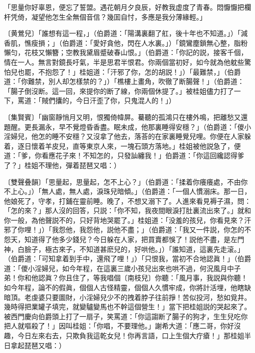 \begin{myquote}
「思量你好辜恩，便忘了誓盟。遇花朝月夕良辰，好教我虚度了青春。悶懨懨把欄杆凭倚，凝望他怎生全無個音信？幾囬自忖，多應是我分薄緣輕。」

{\markfont〔黄鶯兒〕}「誰想有這一程，」{\markfont\small\color{mydarkgray}（伯爵道：「陽溝裏翻了舡，後十年也不知道。」）}「減香肌，憔瘦損；」{\markfont\small\color{mydarkgray}（伯爵道：「愛好貪他，閃在人水裏。」）}「鏡鸞塵鎖無心整，脂粉懶匀，花枝又懶簪；空教我黛眉蹙破春山恨。」{\markfont\small\color{mydarkgray}（伯爵道：「你記的説，接客千個，情在一人。無言對鏡長吁氣，半是思君半恨君。你兩個當初好，如今就為他躭些驚怕兒也罷，不抱怨了！」桂姐道：「汗邪了你，怎的胡説！」）}「最難禁，」{\markfont\small\color{mydarkgray}（伯爵道：「你難禁，別人却怎樣禁的？」）}「樵樓上畫角，吹徹了断腸聲！」{\markfont\small\color{mydarkgray}（伯爵道：「腸子倒沒断。這一回，來提你的断了線，你兩個休提了。」被桂姐儘力打了一下，罵道：「賊們攮的，今日汗歪了你，只鬼混人的！」）}

{\markfont〔集賢賓〕}「幽窗靜悄月又明，恨獨倚幃屏。驀聽的孤鴻只在樓外鳴，把離愁又還題醒。更長漏永，早不覺燈昏香盡。眠未成，他那裏睡得安穩？」{\markfont\small\color{mydarkgray}（伯爵道：「儍小淫婦兒，他怎的睡不安穩？又沒拿了他去，落荅的在家裏睡覺兒哩。你便在人家躲着，逐日懷着羊皮兒，直等東京人來，一塊石頭方落地。」桂姐被他説急了，便道：「爹，你看應花子來！不知怎的，只發訕纏我！」伯爵道：「你這回纔認得爹了？」桂姐不理他，彈着琵琶又唱：）}

{\markfont〔雙聲叠韻〕}「思量起，思量起，怎不上心？」{\markfont\small\color{mydarkgray}（伯爵道：「揉着你癢癢處，不由你不上心。」）}「無人處，無人處，淚珠兒暗傾。」{\markfont\small\color{mydarkgray}（伯爵道：「一個人慣溺床。那一日，他娘死了，守孝，打鋪在靈前睡。晚了，不想又溺下了。人進來看見褥子濕，問：「怎的來？」那人沒的回答，只説：「你不知，我夜間眼淚打肚裏流出來了。」就和你一般，為他聲説不的，只好背地哭罷了。」桂姐道：「没羞的孩兒，你看見來？汗邪了你哩！」）}「我怨他，我怨他，説他不盡；」{\markfont\small\color{mydarkgray}（伯爵道：「我又一件説，你怎的不怨天，知道得了他多少錢兒？今日躲在人家，把買賣都悞了！説他不盡，是左門神，白臉子，極古來子，不知道甚麽兒的，好哄他。」）}「誰知道，這裏先走滚。」{\markfont\small\color{mydarkgray}（伯爵道：「可知拿着到手中，還飛了哩！」）}「只恨我，當初不合地認眞！」{\markfont\small\color{mydarkgray}（伯爵道：「儍小淫婦兒，如今年程，在這裏三歲小孩兒出來也哄不過，何況風月中子弟！你和他認眞？你且住了，等我唱個〔南枝兒〕你聽：「風月事，我説與你聽！如今年程，論不的假眞，個個人古怪精靈，個個人久慣牢成，你將計活埋，他瞎缺暗頂。老虔婆只要圖財，小淫婦兒少不的拽着脖子往前掙！苦似投河，愁如覓井。幾時得把業罐子填完，就變驢變馬也不幹這個營生！」當下把桂姐説的哭起來了。被西門慶向伯爵頭上打了一扇子，笑罵道：「你這謅断了腸子的狗才，生生兒吃你把人就嘔殺了！」因叫桂姐：「你唱，不要理他。」謝希大道：「應二哥，你好沒趣，今日左來右去，只欺負我這乾女兒！你再言語，口上生個大疔瘡！」那桂姐半日拿起琵琶又唱：）}


\end{myquote}
